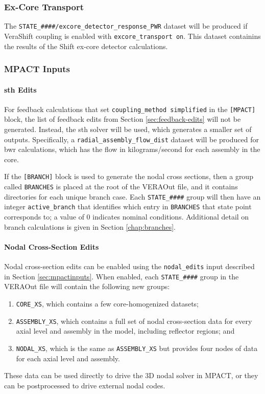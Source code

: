 \subsubsection{Ex-Core Transport}

The \texttt{STATE\_\#\#\#\#/excore\_detector\_response\_PWR} dataset will be produced if VeraShift coupling is enabled with \texttt{excore\_transport on}. This dataset containins the results of the Shift ex-core detector calculations.

\subsubsection{MPACT Inputs}

\paragraph{\acrshort{sth} Edits}

For feedback calculations that set \texttt{coupling\_method simplified} in the \texttt{[MPACT]} block, the list of feedback edits from Section \ref{sec:feedback-edits} will not be generated.  Instead, the \ac{sth} solver will be used, which generates a smaller set of outputs.  Specifically, a \texttt{radial\_assembly\_flow\_dist} dataset will be produced for \ac{bwr} calculations, which has the flow in kilograms/second for each assembly in the core.

If the \texttt{[BRANCH]} block is used to generate the nodal cross sections, then a group called \texttt{BRANCHES} is placed at the root of the VERAOut file, and it contains directories for each unique branch case.  Each \texttt{STATE\_\#\#\#\#} group will then have an integer \texttt{active\_branch} that identifies which entry in \texttt{BRANCHES} that state point corresponds to; a value of 0 indicates nominal conditions.  Additional detail on branch calculations is given in Section \ref{chap:branches}.

\paragraph{Nodal Cross-Section Edits}

Nodal cross-section edits can be enabled using the \texttt{nodal\_edits} input described in Section \ref{sec:mpactinputs}.  When enabled, each \texttt{STATE\_\#\#\#\#} group in the VERAOut file will contain the following new groups:
\begin{enumerate}[noitemsep]
    \item \texttt{CORE\_XS}, which contains a few core-homogenized datasets;
    \item \texttt{ASSEMBLY\_XS}, which contains a full set of nodal cross-section data for every axial level and assembly in the model, including reflector regions; and
    \item \texttt{NODAL\_XS}, which is the same as \texttt{ASSEMBLY\_XS} but provides four nodes of data for each axial level and assembly.
\end{enumerate}
These data can be used directly to drive the 3D nodal solver in MPACT, or they can be postprocessed to drive external nodal codes.

